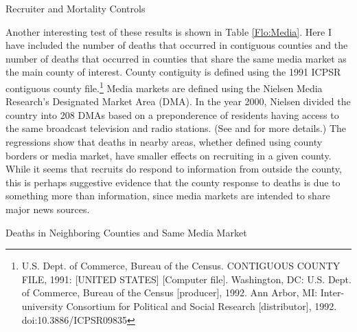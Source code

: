 \documentclass[12pt] {article}
\begin{document}
\begin{table}
\caption{Recruiter and Mortality Controls}
\label{Flo:LNRec&Mort}
\end{table}

Another interesting test of these results is shown in Table \ref{Flo:Media}.
Here I have included the number of deaths that occurred in contiguous
counties and the number of deaths that occurred in counties that share
the same media market as the main county of interest. County contiguity
is defined using the 1991 ICPSR contiguous county file.\footnote{U.S. Dept. of Commerce, Bureau of the Census. CONTIGUOUS COUNTY FILE,
1991: {[}UNITED STATES{]} {[}Computer file{]}. Washington, DC: U.S.
Dept. of Commerce, Bureau of the Census {[}producer{]}, 1992. Ann
Arbor, MI: Inter- university Consortium for Political and Social Research
{[}distributor{]}, 1992. doi:10.3886/ICPSR09835 
} Media markets are defined using the Nielsen Media Research's Designated
Market Area (DMA). In the year 2000, Nielsen divided the country into 208 DMAs based on a preponderence of residents having access to the same broadcast television and radio stations.   (See \cite{DMAsource1} and \cite{DMAsource2} for more details.) The regressions show that deaths in nearby areas, whether defined using county borders or media market, have smaller effects on recruiting in a given county. While it seems that recruits do respond to information from outside the county, this is perhaps suggestive evidence that the county response to deaths is due to something more than information, since media markets are intended to share major news sources. 

\begin{table}
\caption{Deaths in Neighboring Counties and Same Media Market}
\label{Flo:Media}
\scalebox{0.65}{
}
\end{table}
\end{document}
